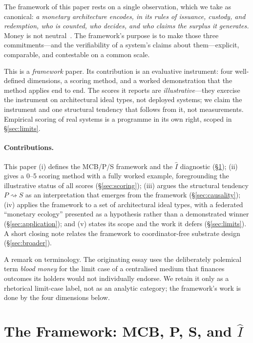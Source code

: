 \documentclass[11pt]{article}
\theoremstyle{definition}
\newcommand{\Iax}{\ensuremath{\hat{I}}}
\begin{document}
The framework of this paper rests on a single observation, which we take as canonical:
\emph{a monetary architecture encodes, in its rules of issuance, custody, and
redemption, who is counted, who decides, and who claims the surplus it generates.}
Money is not neutral~\cite{ingham2004}. The framework's purpose is to make those three commitments---and
the verifiability of a system's claims about them---explicit, comparable, and
contestable on a common scale.

This is a \emph{framework} paper. Its contribution is an evaluative instrument: four
well-defined dimensions, a scoring method, and a worked demonstration that the method
applies end to end. The scores it reports are \emph{illustrative}---they exercise the
instrument on architectural ideal types, not deployed systems; we claim the instrument
and one structural tendency that follows from it, not measurements. Empirical scoring
of real systems is a programme in its own right, scoped in \S\ref{sec:limits}.

\paragraph{Contributions.} This paper (i) defines the MCB/P/S framework and the
$\Iax$ diagnostic (\S\ref{sec:framework}); (ii) gives a 0--5 scoring method with a
fully worked example, foregrounding the illustrative status of all scores
(\S\ref{sec:scoring}); (iii) argues the structural tendency $P \rightsquigarrow S$ as
an interpretation that emerges from the framework (\S\ref{sec:causality}); (iv)
applies the framework to a set of architectural ideal types, with a federated
``monetary ecology'' presented as a hypothesis rather than a demonstrated winner
(\S\ref{sec:application}); and (v) states its scope and the work it defers
(\S\ref{sec:limits}). A short closing note relates the framework to coordinator-free
substrate design (\S\ref{sec:broader}).

A remark on terminology. The originating essay uses the deliberately polemical term
\emph{blood money} for the limit case of a centralised medium that finances outcomes
its holders would not individually endorse. We retain it only as a rhetorical
limit-case label, not as an analytic category; the framework's work is done by the
four dimensions below.

\section{The Framework: MCB, P, S, and \texorpdfstring{$\Iax$}{I-hat}}
\label{sec:framework}
\end{document}
